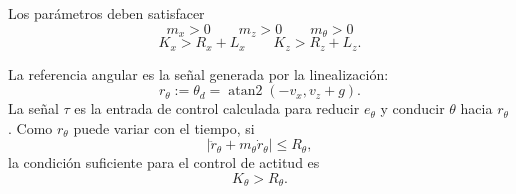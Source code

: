 Los parámetros deben satisfacer
\[
  m_x>0 \qquad m_z>0 \qquad m_\theta>0 
\]
\[
  K_x>R_x+L_x \qquad
  K_z>R_z+L_z.
\]

La referencia angular es la señal generada por la linealización:
\[
  r_\theta:=\theta_d=\operatorname{atan2}(-v_x,v_z+g).
\]
La señal $\tau$ es la entrada de control calculada para reducir
$e_\theta$ y conducir $\theta$ hacia $r_\theta$. Como $r_\theta$ puede variar
con el tiempo, si
\[
  \left|
    \ddot r_\theta+m_\theta\dot r_\theta
  \right|\leq R_\theta,
\]
la condición suficiente para el control de actitud es
\[
  K_\theta>R_\theta.
\]